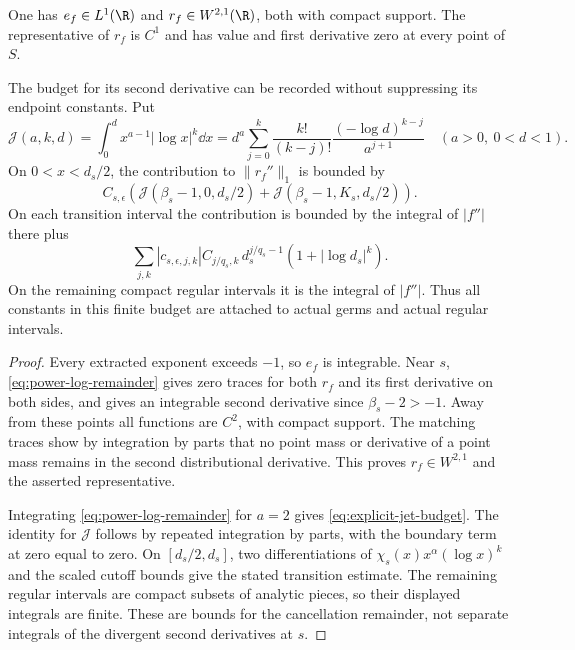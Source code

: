 \begin{proposition}
\label{prop:finite-jet-subtraction}
One has $e_f\in L^1(\R)$ and $r_f\in W^{2,1}(\R)$, both with compact
support. The representative of $r_f$ is $C^1$ and has value and first
derivative zero at every point of $S$.

The budget for its second derivative can be recorded without suppressing
its endpoint constants. Put
\[
 \mathcal J(a,k,d)=\int_0^d x^{a-1}|\log x|^k\dd x
 =d^a\sum_{j=0}^k\frac{k!}{(k-j)!}
                      \frac{(-\log d)^{k-j}}{a^{j+1}}
 \quad(a>0,\ 0<d<1).
\]
On $0<x<d_s/2$, the contribution to $\|r_f''\|_1$ is bounded by
\begin{equation}\label{eq:explicit-jet-budget}
 C_{s,\epsilon}\left(
   \mathcal J(\beta_s-1,0,d_s/2)
  +\mathcal J(\beta_s-1,K_s,d_s/2)\right).
\end{equation}
On each transition interval the contribution is bounded by the integral
of $|f''|$ there plus
\[
 \sum_{j,k}|c_{s,\epsilon,j,k}|C_{j/q_s,k}\,
                d_s^{j/q_s-1}(1+|\log d_s|^k).
\]
On the remaining compact regular intervals it is the integral of
$|f''|$. Thus all constants in this finite budget are attached to actual
germs and actual regular intervals.
\end{proposition}
\begin{proof}
Every extracted exponent exceeds $-1$, so $e_f$ is integrable.
Near $s$, \eqref{eq:power-log-remainder} gives zero traces for both
$r_f$ and its first derivative on both sides, and gives an integrable
second derivative since $\beta_s-2>-1$. Away from these points all
functions are $C^2$, with compact support. The matching traces show by
integration by parts that no point mass or derivative of a point mass
remains in the second distributional derivative. This proves
$r_f\in W^{2,1}$ and the asserted representative.

Integrating \eqref{eq:power-log-remainder} for $a=2$ gives
\eqref{eq:explicit-jet-budget}. The identity for $\mathcal J$ follows
by repeated integration by parts, with the boundary term at zero equal
to zero. On $[d_s/2,d_s]$, two differentiations of
$\chi_s(x)x^\alpha(\log x)^k$ and the scaled cutoff bounds give the
stated transition estimate. The remaining regular intervals are
compact subsets of analytic pieces, so their displayed integrals are
finite. These are bounds for the cancellation remainder, not separate
integrals of the divergent second derivatives at $s$.
\end{proof}

